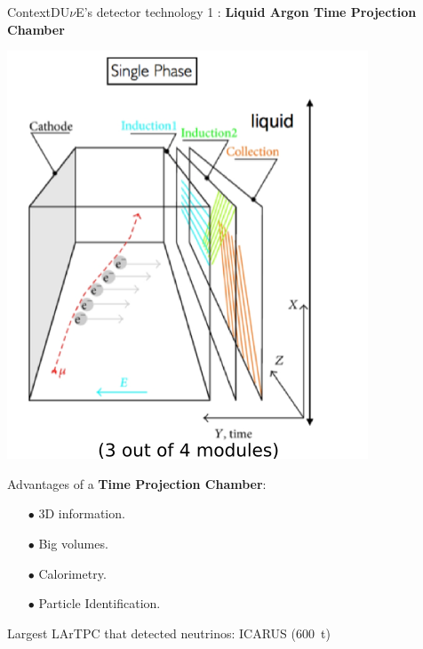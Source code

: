 \documentclass[10pt]{beamer}
\begin{document}
    \begin{frame}{Context}{DU$\nu$E's detector technology 1 : \textbf{Liquid Argon Time Projection Chamber}}
    	\begin{scriptsize}
    		\begin{minipage}{0.48\textwidth}
    			\includegraphics[width=\textwidth]{figures/contexte/lartpc.png}\\
    		\end{minipage}
    		\hfill
    		\begin{minipage}{0.48\textwidth}
    			Advantages of a \textbf{Time Projection Chamber}:    			
    			\begin{itemize}
    				\item[$\bullet$] 3D information.
    				\item[$\bullet$] Big volumes.
    				\item[$\bullet$] Calorimetry.
    				\item[$\bullet$] Particle Identification.
    			\end{itemize}    			
    			Largest LArTPC that detected neutrinos: ICARUS (\SI{600}{\tonne})\\
    			

\end{minipage}
\end{scriptsize}
\end{frame}
\end{document}
